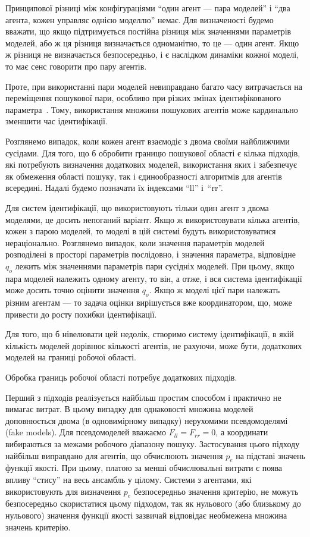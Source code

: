 Принципової різниці між конфігураціями ``один агент --- пара моделей''
і ``два агента, кожен управляє однією моделлю''
немає. Для визначеності будемо вважати, що якщо підтримується
постійна різниця між значеннями параметрів моделей, або ж ця
різниця визначається одноманітно, то це --- один агент. Якщо ж
різниця не визначається безпосередньо, і є наслідком динаміки
кожної моделі, то має сенс говорити про пару агентів.

Проте, при використанні пари моделей невиправдано багато часу
витрачається на переміщення пошукової пари, особливо при різких
змінах ідентифікованого параметра~\cite{atu_asau23}.
Тому, використання множини
пошукових агентів може кардинально зменшити час ідентифікації.


Розглянемо випадок, коли кожен агент взаємодіє з двома
своїми найближчими сусідами. Для того, що б обробити границю
пошукової області є кілька підходів, які потребують визначення
додаткових моделей, використання яких і забезпечує як обмеження
області пошуку, так і єдинообразності алгоритмів для агентів
всередині. Надалі будемо позначати їх індексами ``ll'' і~``rr''.

Для систем ідентифікації, що використовують тільки один
агент з двома моделями, це досить непоганий варіант. Якщо ж
використовувати кілька агентів, кожен з парою моделей,
то моделі в цій системі будуть використовуватися
нераціонально. Розглянемо випадок, коли значення параметрів
моделей розподілені в просторі параметрів послідовно, і
значення параметра, відповідне
$ q_o $ лежить між значеннями параметрів пари сусідніх моделей. При
цьому, якщо пара моделей належить одному агенту, то він, а отже,
і вся система ідентифікації може досить точно оцінити значення
$ q_o $.
Якщо ж моделі цієї пари належать різним агентам ---
то задача оцінки вирішується вже координатором,
що, може привести до росту похибки ідентифікації.

Для того, що б нівелювати цей недолік, створимо систему
ідентифікації, в якій кількість моделей дорівнює кількості
агентів, не рахуючи, може бути, додаткових моделей на границі
робочої області.

Обробка границь робочої області потребує додаткових підходів.

Перший з підходів реалізується найбільш простим способом і
практично не вимагає витрат. В цьому випадку для однаковості
множина моделей доповнюється двома (в одновимірному випадку)
нерухомими псевдомоделямі (fake models). Для псевдомоделей вважаємо
$ F_{ll} = F_{rr} = 0 $, а координати вибираються за межами робочого
діапазону пошуку. Застосування цього підходу найбільш
виправдано для агентів, що обчислюють значення
$p_e$ на підставі значень функції якості. При цьому, платою за менші обчислювальні
витрати є поява  впливу ``стису'' на весь ансамбль у
цілому. Системи з агентами, які використовують для визначення
$p_e$ безпосередньо значення критерію, не можуть безпосередньо
скористатися цьому підходом, так як нульового (або близькому
до нульового) значення функції якості зазвичай відповідає
необмежена множина значень критерію.

